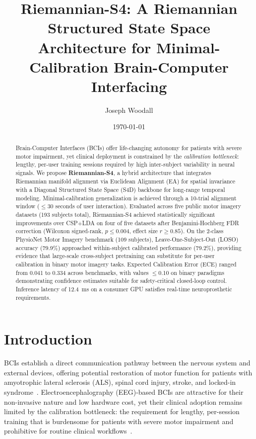 \documentclass[11pt,a4paper]{article}
\title{\textbf{Riemannian-S4: A Riemannian Structured State Space Architecture
for Minimal-Calibration Brain-Computer Interfacing}}
\author[1]{Joseph Woodall}
\affil[1]{Independent Researcher}
\date{\today}
\begin{document}
\maketitle

\begin{abstract}
Brain-Computer Interfaces (BCIs) offer life-changing autonomy for patients with
severe motor impairment, yet clinical deployment is constrained by the
\emph{calibration bottleneck}: lengthy, per-user training sessions required by
high inter-subject variability in neural signals.
We propose \textbf{Riemannian-S4}, a hybrid architecture that integrates
Riemannian manifold alignment via Euclidean Alignment (EA) for spatial
invariance with a Diagonal Structured State Space (S4D) backbone for long-range
temporal modeling.
Minimal-calibration generalization is achieved through a 10-trial alignment
window ($\leq$30 seconds of user interaction).
Evaluated across five public motor imagery datasets (193 subjects total),
Riemannian-S4 achieved statistically significant improvements over
CSP+LDA on four of five datasets after Benjamini-Hochberg FDR correction
(Wilcoxon signed-rank, $p \leq 0.004$, effect size $r \geq 0.85$).
On the 2-class PhysioNet Motor Imagery benchmark (109 subjects),
Leave-One-Subject-Out (LOSO) accuracy (79.9\%) approached within-subject
calibrated performance (79.2\%), providing evidence that large-scale
cross-subject pretraining can substitute for per-user calibration in binary
motor imagery tasks.
Expected Calibration Error (ECE) ranged from 0.041 to 0.334 across benchmarks,
with values $\leq$0.10 on binary paradigms demonstrating confidence estimates
suitable for safety-critical closed-loop control.
Inference latency of 12.4~ms on a consumer GPU satisfies real-time
neuroprosthetic requirements.
\end{abstract}

\section{Introduction}

BCIs establish a direct communication pathway between the nervous system and
external devices, offering potential restoration of motor function for patients
with amyotrophic lateral sclerosis (ALS), spinal cord injury, stroke, and
locked-in syndrome~\cite{Lotte2018}.
Electroencephalography (EEG)-based BCIs are attractive for their non-invasive
nature and low hardware cost, yet their clinical adoption remains limited by the
calibration bottleneck: the requirement for lengthy, per-session training that
is burdensome for patients with severe motor impairment and prohibitive for
routine clinical workflows~\cite{Lotte2018,Jayaram2018}.
\end{document}
